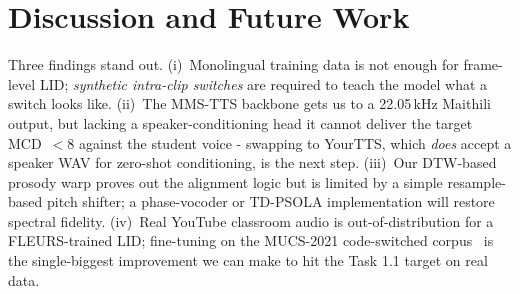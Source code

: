 \documentclass[conference]{IEEEtran}
\begin{document}
\section{Discussion and Future Work}
Three findings stand out.
(i)~Monolingual training data is not enough for frame-level LID;
\textit{synthetic intra-clip switches} are required to teach the
model what a switch looks like.
(ii)~The MMS-TTS backbone gets us to a 22.05\,kHz Maithili output,
but lacking a speaker-conditioning head it cannot deliver the target
MCD~$<\!8$ against the student voice - swapping to YourTTS, which
\emph{does} accept a speaker WAV for zero-shot conditioning, is the
next step.
(iii)~Our DTW-based prosody warp proves out the alignment logic but
is limited by a simple resample-based pitch shifter; a phase-vocoder
or TD-PSOLA implementation will restore spectral fidelity.
(iv)~Real YouTube classroom audio is out-of-distribution for a
FLEURS-trained LID; fine-tuning on the MUCS-2021
code-switched corpus~\cite{diwan2021mucs} is the single-biggest
improvement we can make to hit the Task 1.1 target on real data.
\end{document}
